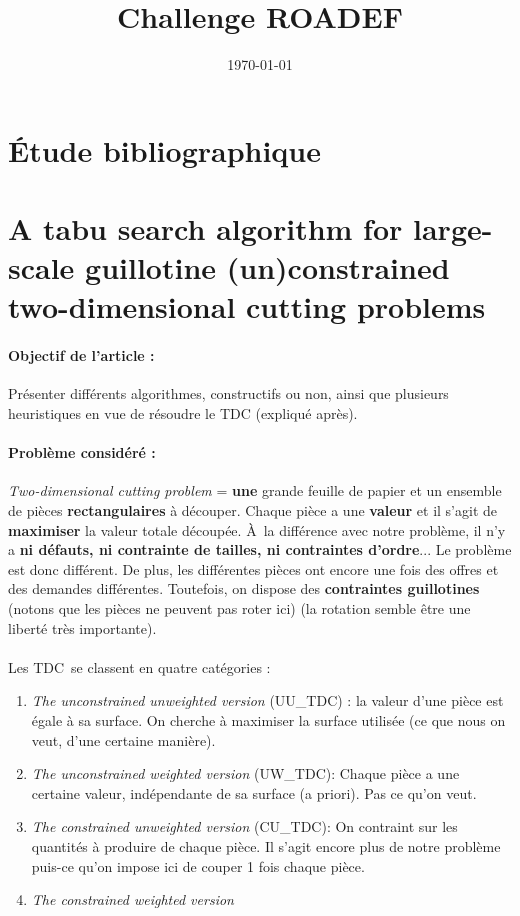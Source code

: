 \documentclass{article}
\title{Challenge ROADEF}
\date{\today}
\author{}
\begin{document}
\tableofcontents

\section{Étude bibliographique}
    \section{A tabu search algorithm for large-scale guillotine
    (un)constrained two-dimensional cutting problems\cite{alvarez2002tabu}}
    \paragraph{Objectif de l'article :} Présenter différents algorithmes, constructifs ou non, ainsi que plusieurs heuristiques en vue de résoudre le TDC (expliqué après).

    \paragraph{Problème considéré :} \textit{Two-dimensional cutting problem} = \textbf{une} grande feuille de papier et un ensemble de pièces \textbf{rectangulaires} à découper. Chaque pièce a une \textbf{valeur} et il s'agit de \textbf{maximiser} la valeur totale découpée. À la différence avec notre problème, il n'y a \textbf{ni défauts, ni contrainte de tailles, ni contraintes d'ordre}... Le problème est donc différent. De plus, les différentes pièces ont encore une fois des offres et des demandes différentes. Toutefois, on dispose des \textbf{contraintes guillotines} (notons que les pièces ne peuvent pas roter ici) (la rotation semble être une liberté très importante).

    \paragraph{}Les TDC se classent en quatre catégories : 
    \begin{enumerate}
        \item \textit{The unconstrained unweighted version} (UU\_TDC) : la valeur d'une pièce est égale à sa surface. On cherche à maximiser la surface utilisée (ce que nous on veut, d'une certaine manière).
        \item \textit{The unconstrained weighted version} (UW\_TDC): Chaque pièce a une certaine valeur, indépendante de sa surface (a priori). Pas ce qu'on veut.
        \item \textit{The constrained unweighted version} (CU\_TDC): On contraint sur les quantités à produire de chaque pièce. Il s'agit encore plus de notre problème puis-ce qu'on impose ici de couper 1 fois chaque pièce.
        \item \textit{The constrained weighted version}
    \end{enumerate}
\end{document}
